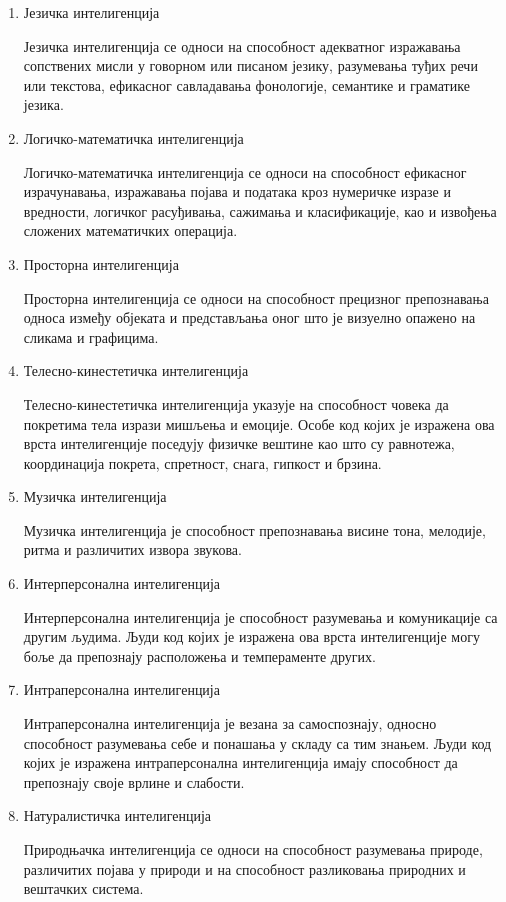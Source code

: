 \documentclass[master]{finthesis}
\begin{document}
\begin{enumerate}
    \item Језичка интелигенција
    
    Језичка интелигенција се односи на способност адекватног изражавања сопствених мисли у говорном или писаном језику, разумевања туђих речи или текстова, ефикасног савладавања фонологије, семантике и граматике језика. 
    \item Логичко-математичка интелигенција

    Логичко-математичка интелигенција се односи на способност ефикасног израчунавања, изражавања појава и података кроз нумеричке изразе и вредности, логичког расуђивања, сажимања и класификације, као и извођења сложених математичких операција.
    \item Просторна интелигенција

    Просторна интелигенција се односи на способност прецизног препознавања односа између објеката и представљања оног што је визуелно опажено на сликама и графицима.
    \item Телесно-кинестетичка интелигенција

    Телесно-кинестетичка интелигенција указује на способност човека да покретима тела изрази мишљења и емоције. Особе код којих је изражена ова врста интелигенције поседују физичке вештине као што су равнотежа, координација покрета, спретност, снага, гипкост и брзина. 
    \item Музичка интелигенција

    Музичка интелигенција је способност препознавања висине тона, мелодије, ритма и различитих извора звукова.
    \item Интерперсонална интелигенција

    Интерперсонална интелигенција је способност разумевања и комуникације са другим људима. Људи код којих је изражена ова врста интелигенције могу боље да препознају расположења и темпераменте других.
    \item Интраперсонална интелигенција

    Интраперсонална интелигенција је везана за самоспознају, односно способност разумевања себе и понашања у складу са тим знањем. Људи код којих је изражена интраперсонална интелигенција имају способност да препознају своје врлине и слабости.
    \item Натуралистичка интелигенција

    Природњачка интелигенција се односи на способност разумевања природе, различитих појава у природи и на способност разликовања природних и вештачких система.
\end{enumerate}
\end{document}
